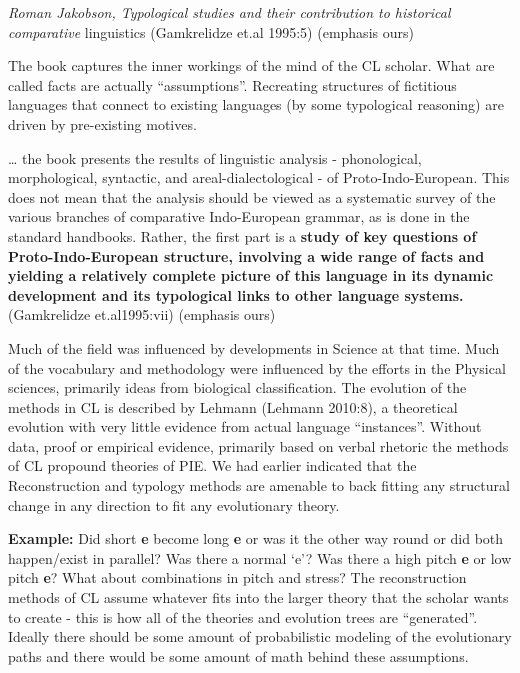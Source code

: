 \begin{myquote}
\textit{Roman Jakobson, Typological studies and their contribution to historical comparative} linguistics (Gamkrelidze et.al 1995:5) (emphasis ours)
\end{myquote}

The book captures the inner workings of the mind of the CL scholar. What are called facts are actually “assumptions”. Recreating structures of fictitious languages that connect to existing languages (by some typological reasoning) are driven by pre-existing motives.

\begin{myquote}
… the book presents the results of linguistic analysis - phonological, morphological, syntactic, and areal-dialectological - of Proto-Indo-European. This does not mean that the analysis should be viewed as a systematic survey of the various branches of comparative Indo-European grammar, as is done in the standard handbooks. Rather, the first part is a \textbf{study of key questions of Proto-Indo-European structure, involving a wide range of facts and yielding a relatively complete picture of this language in its dynamic development and its typological links to other language systems.} (Gamkrelidze et.al1995:vii) (emphasis ours)
\end{myquote}

Much of the field was influenced by developments in Science at that time. Much of the vocabulary and methodology were influenced by the efforts in the Physical sciences, primarily ideas from biological classification. The evolution of the methods in CL is described by Lehmann (Lehmann 2010:8), a theoretical evolution with very little evidence from actual language “instances”. Without data, proof or empirical evidence, primarily based on verbal rhetoric the methods of CL propound theories of PIE. We had earlier indicated that the Reconstruction and typology methods are amenable to back fitting any structural change in any direction to fit any evolutionary theory.

\textbf{Example:} Did short \textbf{e} become long \textbf{e} or was it the other way round or did both happen/exist in parallel? Was there a normal ‘e’? Was there a high pitch \textbf{e} or low pitch \textbf{e}? What about combinations in pitch and stress? The reconstruction methods of CL assume whatever fits into the larger theory that the scholar wants to create - this is how all of the theories and evolution trees are “generated”. Ideally there should be some amount of probabilistic modeling of the evolutionary paths and there would be some amount of math behind these assumptions.

